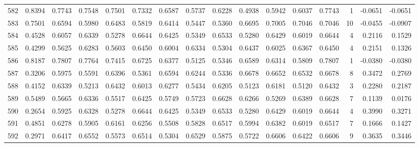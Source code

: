 \begin{tabular}{lrrrrrrrrrrrrrrr}
582 &      0.8394 &  0.7743 &  0.7548 &  0.7501 &  0.7332 &  0.6587 &  0.5737 &  0.6228 &  0.4938 &  0.5942 &   0.6037 &     0.7743 &      1 &                   -0.0651 &                    -0.0651 \\
583 &      0.7501 &  0.6594 &  0.5980 &  0.6483 &  0.5819 &  0.6414 &  0.5447 &  0.5360 &  0.6695 &  0.7005 &   0.7046 &     0.7046 &     10 &                   -0.0455 &                    -0.0907 \\
584 &      0.4528 &  0.6057 &  0.6339 &  0.5278 &  0.6644 &  0.6425 &  0.5349 &  0.6533 &  0.5280 &  0.6429 &   0.6019 &     0.6644 &      4 &                    0.2116 &                     0.1529 \\
585 &      0.4299 &  0.5625 &  0.6283 &  0.5603 &  0.6450 &  0.6004 &  0.6334 &  0.5304 &  0.6437 &  0.6025 &   0.6367 &     0.6450 &      4 &                    0.2151 &                     0.1326 \\
586 &      0.8187 &  0.7807 &  0.7764 &  0.7415 &  0.6725 &  0.6377 &  0.5125 &  0.5346 &  0.6589 &  0.6314 &   0.5809 &     0.7807 &      1 &                   -0.0380 &                    -0.0380 \\
587 &      0.3206 &  0.5975 &  0.5591 &  0.6396 &  0.5361 &  0.6594 &  0.6244 &  0.5336 &  0.6678 &  0.6652 &   0.6532 &     0.6678 &      8 &                    0.3472 &                     0.2769 \\
588 &      0.4152 &  0.6339 &  0.5213 &  0.6432 &  0.6013 &  0.6277 &  0.5434 &  0.6205 &  0.5123 &  0.6181 &   0.5120 &     0.6432 &      3 &                    0.2280 &                     0.2187 \\
589 &      0.5489 &  0.5665 &  0.6336 &  0.5517 &  0.6425 &  0.5749 &  0.5723 &  0.6628 &  0.6266 &  0.5269 &   0.6389 &     0.6628 &      7 &                    0.1139 &                     0.0176 \\
590 &      0.2654 &  0.5925 &  0.6328 &  0.5278 &  0.6644 &  0.6425 &  0.5349 &  0.6533 &  0.5280 &  0.6429 &   0.6019 &     0.6644 &      4 &                    0.3990 &                     0.3271 \\
591 &      0.4851 &  0.6278 &  0.5905 &  0.6161 &  0.6256 &  0.5508 &  0.5828 &  0.6517 &  0.5994 &  0.6382 &   0.6019 &     0.6517 &      7 &                    0.1666 &                     0.1427 \\
592 &      0.2971 &  0.6417 &  0.6552 &  0.5573 &  0.6514 &  0.5304 &  0.6529 &  0.5875 &  0.5722 &  0.6606 &   0.6422 &     0.6606 &      9 &                    0.3635 &                     0.3446 \\

\end{tabular}
